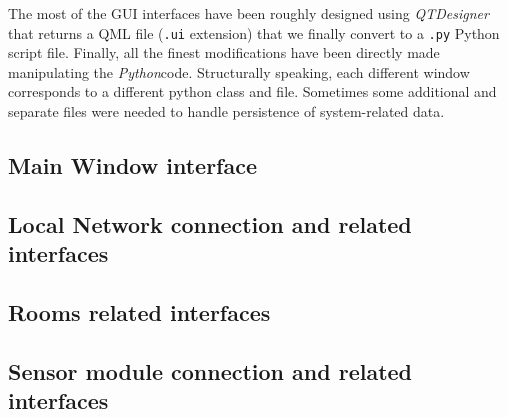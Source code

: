 \documentclass[a4paper]{article}
\begin{document}
        The most of the GUI interfaces have been roughly designed using \emph{QTDesigner} that returns a QML file (\texttt{.ui} extension) that we finally convert to a \texttt{.py} Python script file. Finally, all the finest modifications have been directly made manipulating the \emph{Python}code.
        Structurally speaking, each different window corresponds to a different python class and file. Sometimes some additional and separate files were needed to handle persistence of system-related data.

        \subsection{Main Window interface}

        \subsection{Local Network connection and related interfaces}

        \subsection{Rooms related interfaces}

        \subsection{Sensor module connection and related interfaces}

 
    
\end{document}
